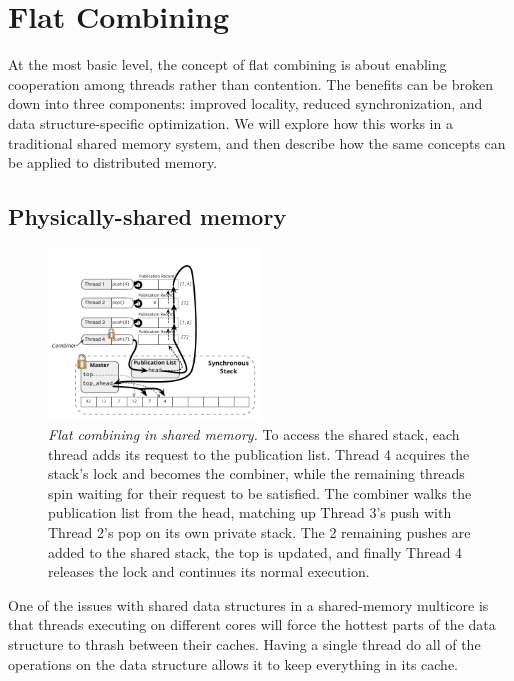 \section{Flat Combining}

At the most basic level, the concept of flat combining is about enabling cooperation among threads rather than contention. The benefits can be broken down into three components: improved locality, reduced synchronization, and data structure-specific optimization. We will explore how this works in a traditional shared memory system, and then describe how the same concepts can be applied to distributed memory.


\subsection{Physically-shared memory}

\begin{figure}[ht]
  \centering
  \includegraphics[width=0.5\textwidth]{figs/fc_shared_mem.pdf}
  \caption{\emph{Flat combining in shared memory.}
    To access the shared stack, each thread adds its request to the publication list. Thread 4 acquires the stack's lock and becomes the combiner, while the remaining threads spin waiting for their request to be satisfied. The combiner walks the publication list from the head, matching up Thread 3's push with Thread 2's pop on its own private stack. The 2 remaining pushes are added to the shared stack, the top is updated, and finally Thread 4 releases the lock and continues its normal execution.
  }
  \label{fig:fc_shared_mem}
\end{figure}

One of the issues with shared data structures in a shared-memory multicore is that threads executing on different cores will force the hottest parts of the data structure to thrash between their caches. Having a single thread do all of the operations on the data structure allows it to keep everything in its cache.

